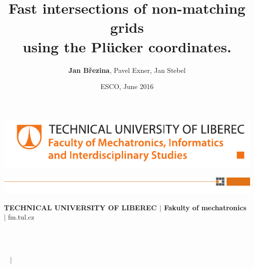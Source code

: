 \documentclass[10pt]{beamer} %
\title[Fast non-matching grids]{
\textcolor{emph2}{Fast intersections of non-matching grids\\ using the Pl\"ucker coordinates.}
\vspace{2ex}
}
\author{{\bf Jan Březina}, Pavel Exner, Jan Stebel}
\institute{Technical University of Liberec, Czech Rep.}
\date{ESCO, June 2016}
\begin{document}


{  
    {
        
        \includegraphics[width=0.5\paperwidth]{graphics/logo-fm-cmyk-en.pdf}

    }
    
    {\includegraphics[width=\paperwidth]{graphics/fm-spojovaci.png}
        
        \vspace{-6mm}
        \hspace{5mm}
        {\bf TECHNICAL UNIVERSITY OF LIBEREC 
            \textcolor{structure}
            {$\boldsymbol{|}$ Fakulty of mechatronics}
        }
        \textcolor{structure}{$\boldsymbol{|}$} fm.tul.cz

        \vspace{-3.1mm}
        \textcolor{white}{\insertframenumber/\inserttotalframenumber} 
        \hspace{2mm}

        \vspace{3mm}
    }
    
    \begin{frame}    
        \vspace{1cm}
        {\bf\large\inserttitle}\\
        \vspace{2mm}
        \textit{\insertauthor~ \textcolor{structure}{$\boldsymbol{|}$} \insertdate}
    \end{frame}
}
\end{document}
